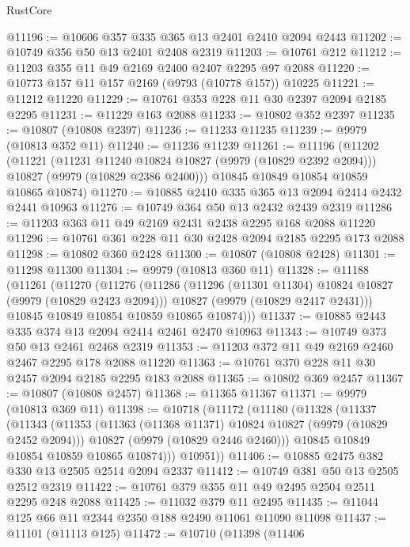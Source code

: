 \begin{lexlean}{RustCore}
\begin{coremodule}
@11196 := @10606 @357 @335 @365 @13 @2401 @2410 @2094 @2443
@11202 := @10749 @356 @50 @13 @2401 @2408 @2319
@11203 := @10761 @212
@11212 := @11203 @355 @11 @49 @2169 @2400 @2407 @2295 @97 @2088
@11220 := @10773 @157 @11 @157 @2169 (@9793 (@10778 @157)) @10225
@11221 := @11212 @11220
@11229 := @10761 @353 @228 @11 @30 @2397 @2094 @2185 @2295
@11231 := @11229 @163 @2088
@11233 := @10802 @352 @2397
@11235 := @10807 (@10808 @2397)
@11236 := @11233 @11235
@11239 := @9979 (@10813 @352 @11)
@11240 := @11236 @11239
@11261 := @11196
    (@11202
      (@11221
        (@11231 @11240 @10824 @10827 (@9979 (@10829 @2392 @2094)))
        @10827
        (@9979 (@10829 @2386 @2400)))
      @10845
      @10849
      @10854
      @10859
      @10865
      @10874)
@11270 := @10885 @2410 @335 @365 @13 @2094 @2414 @2432 @2441 @10963
@11276 := @10749 @364 @50 @13 @2432 @2439 @2319
@11286 := @11203 @363 @11 @49 @2169 @2431 @2438 @2295 @168 @2088 @11220
@11296 := @10761 @361 @228 @11 @30 @2428 @2094 @2185 @2295 @173 @2088
@11298 := @10802 @360 @2428
@11300 := @10807 (@10808 @2428)
@11301 := @11298 @11300
@11304 := @9979 (@10813 @360 @11)
@11328 := @11188
    (@11261
      (@11270
        (@11276
          (@11286
            (@11296 (@11301 @11304) @10824 @10827 (@9979 (@10829 @2423 @2094)))
            @10827
            (@9979 (@10829 @2417 @2431)))
          @10845
          @10849
          @10854
          @10859
          @10865
          @10874)))
@11337 := @10885 @2443 @335 @374 @13 @2094 @2414 @2461 @2470 @10963
@11343 := @10749 @373 @50 @13 @2461 @2468 @2319
@11353 := @11203 @372 @11 @49 @2169 @2460 @2467 @2295 @178 @2088 @11220
@11363 := @10761 @370 @228 @11 @30 @2457 @2094 @2185 @2295 @183 @2088
@11365 := @10802 @369 @2457
@11367 := @10807 (@10808 @2457)
@11368 := @11365 @11367
@11371 := @9979 (@10813 @369 @11)
@11398 := @10718
    (@11172
      (@11180
        (@11328
          (@11337
            (@11343
              (@11353
                (@11363 (@11368 @11371) @10824 @10827 (@9979 (@10829 @2452 @2094)))
                @10827
                (@9979 (@10829 @2446 @2460)))
              @10845
              @10849
              @10854
              @10859
              @10865
              @10874)))
        @10951))
@11406 := @10885 @2475 @382 @330 @13 @2505 @2514 @2094 @2337
@11412 := @10749 @381 @50 @13 @2505 @2512 @2319
@11422 := @10761 @379 @355 @11 @49 @2495 @2504 @2511 @2295 @248 @2088
@11425 := @11032 @379 @11 @2495
@11435 := @11044 @125 @66 @11 @2344 @2350 @188 @2490 @11061 @11090 @11098
@11437 := @11101 (@11113 @125)
@11472 := @10710
    (@11398
      (@11406

\end{coremodule}
\end{lexlean}
